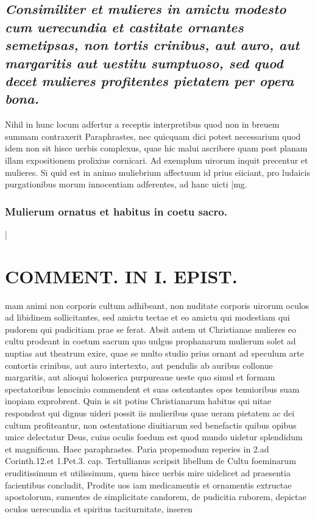 \documentclass{article}
\begin{document}
\begin{pages}
\subsection*{\textit{Consimiliter et mulieres in amictu modesto cum uerecundia et castitate ornantes semetipsas, non tortis crinibus, aut auro, aut margaritis aut uestitu sumptuoso, sed quod decet mulieres profitentes pietatem per opera bona. }}\pstart Nihil in hunc locum adfertur a receptis interpretibus quod non in breuem summam contraxerit Paraphrastes, nec quicquam dici potest necessarium quod idem non sit hisce uerbis complexus, quae hic malui ascribere quam post planam illam expositionem prolixius cornicari. Ad exemplum uirorum inquit precentur et mulieres. Si quid est in animo muliebrium affectuum id prius eiiciant, pro ludaicis purgationibus morum innocentiam adferentes, ad hanc uicti\pend
|mg. \subsubsection*{Mulierum ornatus et habitus in coetu sacro. }|
\section*{COMMENT. IN I. EPIST. }\pstart mam animi non corporis cultum adhibeant, non nuditate corporis uirorum oculos ad libidinem sollicitantes, sed amictu tectae et eo amictu qui modestiam qui pudorem qui pudicitiam prae se ferat. Absit autem ut Christianae mulieres eo cultu prodeant in coetum sacrum quo uulgus prophanarum mulierum solet ad nuptias aut theatrum exire, quae se multo studio prius ornant ad speculum arte contortis crinibus, aut auro intertexto, aut pendulis ab auribus collonue margaritis, aut alioqui holoserica purpureaue ueste quo simul et formam spectatoribus lenocinio commendent et suas ostentantes opes tenuioribus suam inopiam exprobrent. Quin is sit potius Christianarum habitus qui uitae respondeat qui dignus uideri possit iis mulieribus quae ueram pietatem ac dei cultum profiteantur, non ostentatione diuitiarum sed benefactis quibus opibus unice delectatur Deus, cuius oculis foedum est quod mundo uidetur splendidum et magnificum. Haec paraphrastes. Paria propemodum reperies in 2.ad Corinth.12.et 1.Pet.3. cap. Tertullianus scripsit libellum de Cultu foeminarum eruditissimum et utilissimum, quem hisce uerbis mire uidelicet ad praesentia facientibus concludit, Prodite uos iam medicamentis et ornamentis extructae apostolorum, sumentes de simplicitate candorem, de pudicitia ruborem, depictae oculos uerecundia et spiritus taciturnitate, inseren\pend

\end{pages}
\end{document}
